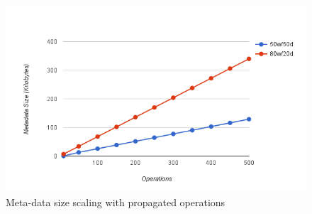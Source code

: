 \begin{figure}[h]
\centering
\includegraphics[scale=0.7]{files/chart3.png}
\caption{Meta-data size scaling with propagated operations}
\label{chart3}
\end{figure}